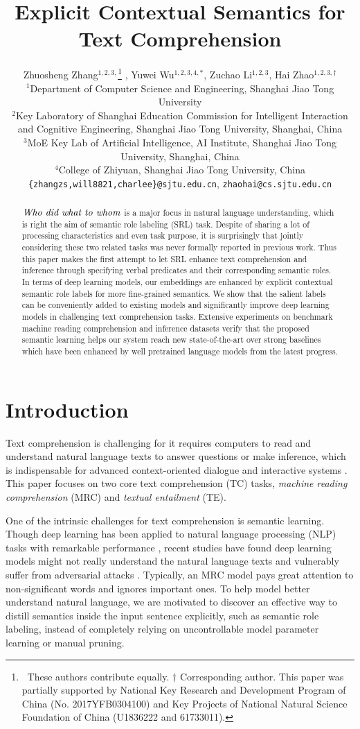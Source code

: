 \documentclass[11pt]{article}
\title{Explicit Contextual Semantics for Text Comprehension}
\author{
	Zhuosheng Zhang$^{1,2,3,}$\thanks{$\ $ These authors contribute equally. $\dagger$ Corresponding author. This paper was partially supported by National Key Research and Development Program of China (No. 2017YFB0304100) and Key Projects of National Natural Science Foundation of China (U1836222 and 61733011).}  ,
	Yuwei Wu$^{1,2,3,4,*}$,
	Zuchao Li$^{1,2,3}$,
	Hai Zhao$^{1,2,3,\dagger}$
	\\
	$^1$Department of Computer Science and Engineering, Shanghai Jiao Tong University\\
	$^2$Key Laboratory of Shanghai Education Commission for Intelligent Interaction\\
	and Cognitive Engineering, Shanghai Jiao Tong University, Shanghai, China\\
	$^3$MoE Key Lab of Artificial Intelligence, AI Institute, Shanghai Jiao Tong University, Shanghai, China\\
	$^{4}$College of Zhiyuan, Shanghai Jiao Tong University, China\\
	{\tt\{zhangzs,will8821,charlee\}@sjtu.edu.cn},
	{\tt zhaohai@cs.sjtu.edu.cn}
}
\date{}
\begin{document}
\maketitle
\begin{abstract}
  $\emph{Who did what to whom}$ is a major focus in natural language understanding, which is right the aim of semantic role labeling (SRL) task. Despite of sharing a lot of processing characteristics and even task purpose, it is surprisingly that jointly considering these two related tasks was never formally reported in previous work. Thus this paper makes the first attempt to let SRL enhance text comprehension and inference through specifying verbal predicates and their corresponding semantic roles. In terms of deep learning models, our embeddings are enhanced by explicit contextual semantic role labels for more fine-grained semantics. We show that the salient labels can be conveniently added to existing models and significantly improve deep learning models in challenging text comprehension tasks. Extensive experiments on benchmark machine reading comprehension and inference datasets verify that the proposed semantic learning helps our system reach new state-of-the-art over strong baselines which have been enhanced by well pretrained language models from the latest progress.
\end{abstract}

\section{Introduction}

Text comprehension is challenging for it requires computers to read and understand natural language texts to answer questions or make inference, which is indispensable for advanced context-oriented dialogue \citep{zhang2018DUA,Zhu2018lingke} and interactive systems \citep{chen2015neural,Huang2018Moon,zhang2019ime}. This paper focuses on two core text comprehension (TC) tasks, \emph{machine reading comprehension} (MRC) and \emph{textual entailment} (TE). 

One of the intrinsic challenges for text comprehension is semantic learning. Though deep learning has been applied to natural language processing (NLP) tasks with remarkable performance \citep{Cai2017Fast,zhang2018exploring,zhang2018OneShot,Bai2018deep,Zhang2018Effective,xiao-etal-2019-lattice}, recent studies have found deep learning models might not really understand the natural language texts \citep{Mudrakarta2018Did} and vulnerably suffer from adversarial attacks \citep{Jia2017Adversarial}. Typically, an MRC model pays great attention to non-significant words and ignores important ones. To help model better understand natural language, we are motivated to discover an effective way to distill semantics inside the input sentence explicitly, such as semantic role labeling, instead of completely relying on uncontrollable model parameter learning or manual pruning.
\end{document}
